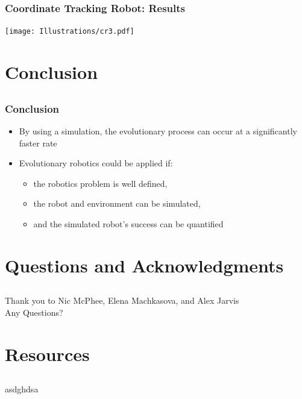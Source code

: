 \documentclass{beamer}
\begin{document}
\begin{frame}
  \frametitle{Coordinate Tracking Robot: Results}
\begin{center}
 \texttt{[image: Illustrations/cr3.pdf]}
       \\
\end{center}
\end{frame}

\section{Conclusion}
\subsection{}
\begin{frame}
  \frametitle{Conclusion}
  \begin{itemize}
\item By using a simulation, the evolutionary process can occur at a significantly faster rate
\item Evolutionary robotics could be applied if:
 \begin{itemize}
\item the robotics problem is well defined, %
\item the robot and environment can be simulated,
\item and the simulated robot's success can be quantified
\end{itemize}
\end{itemize}
\end{frame}

\section*{Questions and Acknowledgments}
\subsection*{}
\begin{frame}
  \frametitle{}
\begin{center}
Thank you to Nic McPhee, Elena Machkasova, and Alex Jarvis\\
  \large Any Questions? 
\end{center}

\end{frame}

\section*{Resources}
\subsection*{}
\begin{frame}
  \frametitle{}
\begin{center}
  \large asdghdsa 
\end{center}
\end{frame}
\end{document}

